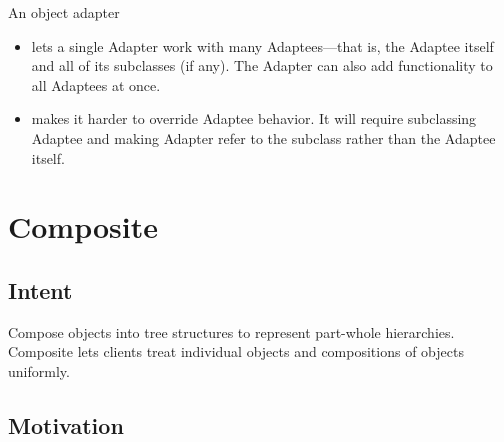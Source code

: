 An object adapter
\begin{itemize}
    \item lets a single Adapter work with many Adaptees—that is, the Adaptee itself and all of its subclasses (if any). The Adapter can also add functionality to all Adaptees at once.
    \item makes it harder to override Adaptee behavior. It will require subclassing Adaptee and making Adapter refer to the subclass rather than the Adaptee itself.
\end{itemize}

\section{Composite}

\subsection*{Intent}

Compose objects into tree structures to represent part-whole hierarchies. Composite lets clients treat individual objects and compositions of objects uniformly.

\subsection*{Motivation}


